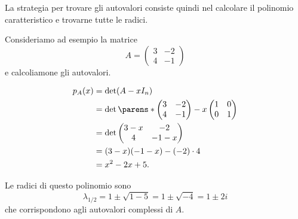 La strategia per trovare gli autovalori consiste quindi nel calcolare il polinomio caratteristico e trovarne tutte le radici.

\begin{example}
    Consideriamo ad esempio la matrice \[
        A = \begin{pmatrix}
            3 & -2\\
            4 & -1
        \end{pmatrix}
    \] e calcoliamone gli autovalori.

    \begin{align*}
        p_A(x) &= \det (A - xI_n)\\
        &= \det \parens*{
            \begin{pmatrix}
                3 & -2\\
                4 & -1
            \end{pmatrix} - x\begin{pmatrix}
                1 & 0\\
                0 & 1\\
            \end{pmatrix}
        } \\
        &= \det \begin{pmatrix}
            3-x & -2\\
            4   & -1-x
        \end{pmatrix} \\
        &= (3-x)(-1-x) -(-2) \cdot 4\\
        &= x^2 - 2x + 5.
    \end{align*}

    Le radici di questo polinomio sono \[
        \lambda_{1/2} = 1 \pm \sqrt{1 - 5} = 1 \pm \sqrt{-4} = 1 \pm 2i
    \] che corrispondono agli autovalori complessi di $A$.
\end{example}

